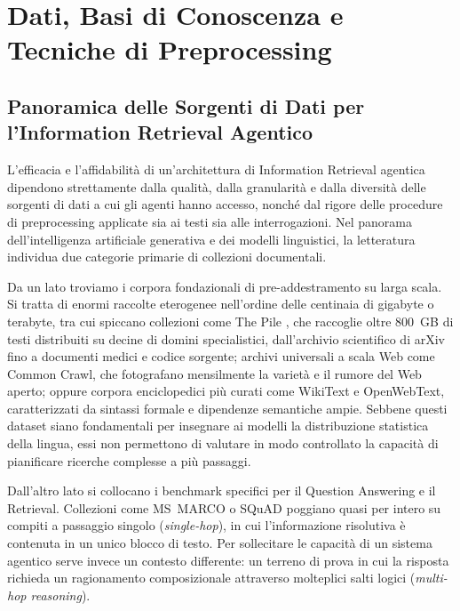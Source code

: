 \chapter{Dati, Basi di Conoscenza e Tecniche di Preprocessing}
\label{chap:dati_preprocessing}

\section{Panoramica delle Sorgenti di Dati per l'Information Retrieval Agentico}
\label{sec:panoramica_dati}

L'efficacia e l'affidabilità di un'architettura di Information Retrieval agentica dipendono strettamente dalla qualità, dalla granularità e dalla diversità delle sorgenti di dati a cui gli agenti hanno accesso, nonché dal rigore delle procedure di preprocessing applicate sia ai testi sia alle interrogazioni. Nel panorama dell'intelligenza artificiale generativa e dei modelli linguistici, la letteratura individua due categorie primarie di collezioni documentali.

Da un lato troviamo i corpora fondazionali di pre-addestramento su larga scala. Si tratta di enormi raccolte eterogenee nell'ordine delle centinaia di gigabyte o terabyte, tra cui spiccano collezioni come The Pile \cite{gao2020pile}, che raccoglie oltre 800~GB di testi distribuiti su decine di domini specialistici, dall'archivio scientifico di arXiv fino a documenti medici e codice sorgente; archivi universali a scala Web come Common Crawl, che fotografano mensilmente la varietà e il rumore del Web aperto; oppure corpora enciclopedici più curati come WikiText \cite{merity2016wikitext} e OpenWebText, caratterizzati da sintassi formale e dipendenze semantiche ampie. Sebbene questi dataset siano fondamentali per insegnare ai modelli la distribuzione statistica della lingua, essi non permettono di valutare in modo controllato la capacità di pianificare ricerche complesse a più passaggi.

Dall'altro lato si collocano i benchmark specifici per il Question Answering e il Retrieval. Collezioni come MS~MARCO \cite{bajaj2016msmarco} o SQuAD \cite{rajpurkar2016squad} poggiano quasi per intero su compiti a passaggio singolo (\textit{single-hop}), in cui l'informazione risolutiva è contenuta in un unico blocco di testo. Per sollecitare le capacità di un sistema agentico serve invece un contesto differente: un terreno di prova in cui la risposta richieda un ragionamento composizionale attraverso molteplici salti logici (\textit{multi-hop reasoning}).

